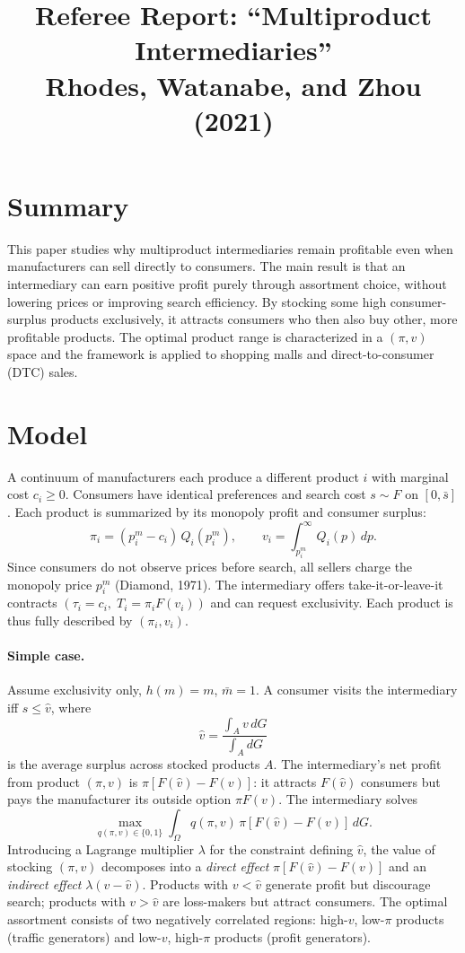 \documentclass[11pt]{article}
\title{Referee Report: ``Multiproduct Intermediaries'' \\ \small Rhodes, Watanabe, and Zhou (2021)}
\author{}
\date{}
\begin{document}
\maketitle
\vspace{-2em}

\section*{Summary}

This paper studies why multiproduct intermediaries remain profitable even when manufacturers can sell directly to consumers. The main result is that an intermediary can earn positive profit purely through assortment choice, without lowering prices or improving search efficiency. By stocking some high consumer-surplus products exclusively, it attracts consumers who then also buy other, more profitable products. The optimal product range is characterized in a $(\pi, v)$ space and the framework is applied to shopping malls and direct-to-consumer (DTC) sales.

\section*{Model}

A continuum of manufacturers each produce a different product $i$ with marginal cost $c_i \geq 0$. Consumers have identical preferences and search cost $s \sim F$ on $[0, \bar{s}]$. Each product is summarized by its monopoly profit and consumer surplus:
\[
\pi_i = (p_i^m - c_i)\, Q_i(p_i^m), \qquad v_i = \int_{p_i^m}^{\infty} Q_i(p)\, dp.
\]
Since consumers do not observe prices before search, all sellers charge the monopoly price $p_i^m$ (Diamond, 1971). The intermediary offers take-it-or-leave-it contracts $(\tau_i = c_i,\; T_i = \pi_i F(v_i))$ and can request exclusivity. Each product is thus fully described by $(\pi_i, v_i)$.

\paragraph{Simple case.} Assume exclusivity only, $h(m) = m$, $\bar{m} = 1$. A consumer visits the intermediary iff $s \leq \hat{v}$, where
\[
\hat{v} = \frac{\int_A v\, dG}{\int_A dG}
\]
is the average surplus across stocked products $A$. The intermediary's net profit from product $(\pi, v)$ is $\pi[F(\hat{v}) - F(v)]$: it attracts $F(\hat{v})$ consumers but pays the manufacturer its outside option $\pi F(v)$. The intermediary solves
\[
\max_{q(\pi,v) \in \{0,1\}} \int_\Omega q(\pi,v)\, \pi [F(\hat{v}) - F(v)]\, dG.
\]
Introducing a Lagrange multiplier $\lambda$ for the constraint defining $\hat{v}$, the value of stocking $(\pi, v)$ decomposes into a \emph{direct effect} $\pi[F(\hat{v}) - F(v)]$ and an \emph{indirect effect} $\lambda(v - \hat{v})$. Products with $v < \hat{v}$ generate profit but discourage search; products with $v > \hat{v}$ are loss-makers but attract consumers. The optimal assortment consists of two negatively correlated regions: high-$v$, low-$\pi$ products (traffic generators) and low-$v$, high-$\pi$ products (profit generators).
\end{document}
